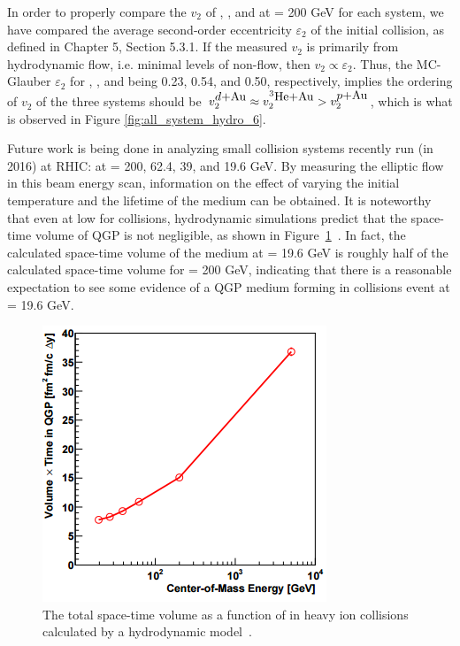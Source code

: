 In order to properly compare the $v_2$ of \pau, \dau, and \hau at \sqsn = 200 GeV for each system, we have compared the average second-order eccentricity $\varepsilon_2$ of the initial collision, as defined in Chapter 5, Section 5.3.1. If the measured $v_2$ is primarily from hydrodynamic flow, i.e. minimal levels of non-flow, then $v_2 \propto \varepsilon_2$. Thus, the MC-Glauber $\varepsilon_2$ for \pau, \dau, and \hau being 0.23, 0.54, and 0.50, respectively, implies the ordering of $v_2$ of the three systems should be $v_2^{\mbox{$d$+Au}} \approx v_2^{\mbox{$^3\text{He}$+Au}} > v_2^{\mbox{$p$+Au}}$, which is what is observed in Figure \ref{fig:all_system_hydro_6}.

Future work is being done in analyzing small collision systems recently run (in 2016) at RHIC: \dau at \sqsn = 200, 62.4, 39, and 19.6 GeV. By measuring the elliptic flow in this \dau beam energy scan, information on the effect of varying the initial temperature and the lifetime of the medium can be obtained. It is noteworthy that even at low \sqsn for \dau collisions, hydrodynamic simulations predict that the space-time volume of QGP is not negligible, as shown in Figure~\ref{fig:size_or_mediumcalc}~\cite{PhysRevC.93.044910}. In fact, the calculated space-time volume of the medium at \sqsn = 19.6 GeV is roughly half of the calculated space-time volume for \sqsn = 200 GeV, indicating that there is a reasonable expectation to see some evidence of a QGP medium forming in \dau collisions event at \sqsn = 19.6 GeV.

\begin{figure}[!ht]
\begin{center}
\includegraphics[width=0.5\linewidth]{figs/size_of_medium_calculation.png}
\caption{The total space-time volume as a function of \sqsn in heavy ion collisions calculated by a hydrodynamic model~\cite{PhysRevC.93.044910}.}
\label{fig:size_or_mediumcalc}
\end{center}
\end{figure}

